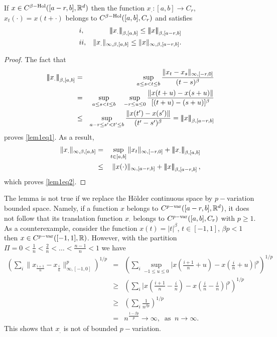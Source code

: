 \documentclass[graybox]{svmult}
\newcommand{\R}{\ensuremath{\mathbb{R}}}
\newcommand{\ltn}{\ensuremath{\left| \! \left| \! \left|}}
\newcommand{\rtn}{\ensuremath{\right| \! \right| \! \right|}}
\begin{document}
\begin{lemma}\label{lem1}
	If $x\in C^{\beta\rm{-Hol}}([a-r,b],\R^d)$ then the function $x_{.}:[a,b]\rightarrow C_r$, $x_t(\cdot)= x(t+\cdot)$ belongs to $C^{\beta\rm{-Hol}}([a,b],C_r)$ and satisfies
	\begin{eqnarray}
	&i,& \ltn x_{.} \rtn_{\beta,[a,b]} \leq \ltn x \rtn_{\beta,[a-r,b]} \label{lem1eq1}\\
	&ii,&\| x_{.} \|_{\infty,\beta,[a,b]} \leq \| x \|_{\infty,\beta,[a-r,b]}. \label{lem1eq2}
	\end{eqnarray}
\end{lemma}
\begin{proof}
	The fact that
	\begin{eqnarray*}
		\ltn x_{.} \rtn_{\beta,[a,b]} &=& \sup_{a\leq s<t \leq b}\frac{\|x_t-x_s\|_{\infty,[-r,0]}}{(t-s)^\beta} \\
		&=&\sup_{a\leq s<t \leq b}\quad\sup_{-r\leq u\leq 0}\frac{\|x(t+u)-x(s+u)\|}{[(t+u)-(s+u)]^\beta}\notag\\
		&\leq & \sup_{a-r\leq s'<t'\leq b}\frac{\|x(t')-x(s')\|}{(t'-s')^\beta}=\ltn x \rtn_{\beta,[a-r,b]} \\
	\end{eqnarray*}
	proves \eqref{lem1eq1}. As a result,
	\begin{eqnarray*}
		\| x_{.} \|_{\infty,\beta,[a,b]}&=& \sup_{t\in [a,b]}\|x_t\|_{\infty,[-r,0]}+\ltn x_{.} \rtn_{\beta,[a,b]}\\
		& \leq& \|x(\cdot)\|_{\infty,[a-r,b]}+ \ltn x \rtn_{\beta,[a-r,b]},
	\end{eqnarray*}
	which proves \eqref{lem1eq2}.
\end{proof}

\begin{remark}
	The lemma is not true if we replace the H\"older continuous space by $p-$variation bounded space. Namely, if a function $x$ belongs to $C^{p\rm{-var}}([a-r,b],\R^d)$, it does not follow that its translation function $x_\cdot$ belongs to $C^{p\rm{-var}}([a,b],C_r)$  with $p\geq 1$. As a counterexample, consider the function $x(t)=|t|^\beta$, $t\in [-1,1]$, $\beta p <1$ then $x\in C^{p\rm{-var}}([-1,1],\R)$. However,
	with the partition $\Pi = 0< \frac{1}{n}<\frac{2}{n}<\dots < \frac{n-1}{n} < 1$ we have
	\begin{eqnarray*}
		\left(\sum_i \|x_{\frac{i+1}{n}} -x_{\frac{i}{n}} \|^{p}_{\infty,[-1,0]}\right)^{1/p} &=&\left(\sum_i \sup_{-1\leq u\leq 0}\Big|x(\frac{i+1}{n}+u) -x(\frac{i}{n}+u) \Big|^{p}\right)^{1/p}\\
		&\geq & \left(\sum_i \Big|x(\frac{i+1}{n}-\frac{i}{n} ) -x(\frac{i}{n}-\frac{i}{n}) \Big|^{p}\right)^{1/p}\\
		&\geq & \left(\sum_i \frac{1}{n^{\beta p}}\right)^{1/p}\\
		&=&n^{\frac{1-\beta p}{p}} \to \infty,\;\; \text{as} \;\; n\to \infty.
	\end{eqnarray*}
	This shows that $x_.$ is not of bounded $p-$variation.
\end{remark}
\end{document}
